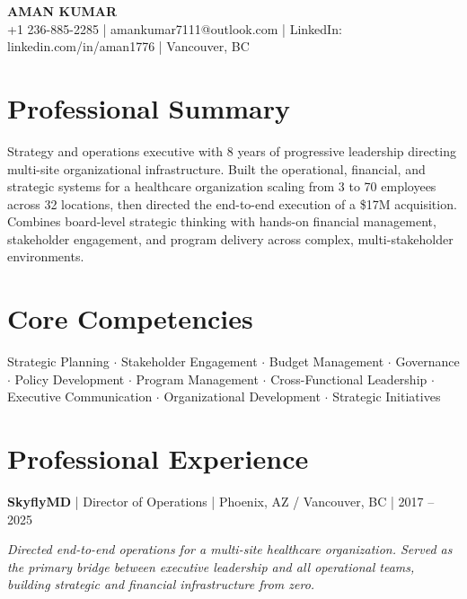 \documentclass[10pt]{article}
\begin{document}
\begin{center}
{\Large\bfseries AMAN KUMAR} \\[4pt]
+1 236-885-2285  |  amankumar7111@outlook.com  |  LinkedIn: linkedin.com/in/aman1776  |  Vancouver, BC
\end{center}

\section*{Professional Summary}
Strategy and operations executive with 8 years of progressive leadership directing multi-site organizational infrastructure. Built the operational, financial, and strategic systems for a healthcare organization scaling from 3 to 70 employees across 32 locations, then directed the end-to-end execution of a \$17M acquisition. Combines board-level strategic thinking with hands-on financial management, stakeholder engagement, and program delivery across complex, multi-stakeholder environments.

\section*{Core Competencies}
Strategic Planning $\cdot$ Stakeholder Engagement $\cdot$ Budget Management $\cdot$ Governance $\cdot$ Policy Development $\cdot$ Program Management $\cdot$ Cross-Functional Leadership $\cdot$ Executive Communication $\cdot$ Organizational Development $\cdot$ Strategic Initiatives

\section*{Professional Experience}

\textbf{SkyflyMD} \hspace{2pt}| Director of Operations \hspace{2pt}| Phoenix, AZ / Vancouver, BC \hspace{2pt}| 2017 -- 2025

\textit{Directed end-to-end operations for a multi-site healthcare organization. Served as the primary bridge between executive leadership and all operational teams, building strategic and financial infrastructure from zero.}
\end{document}
